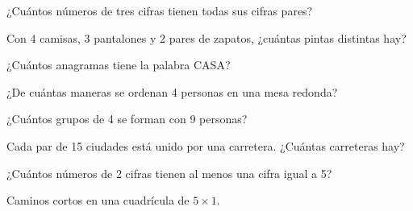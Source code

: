 \evaluacion
\begin{ejercicios}
\item ¿Cuántos números de tres cifras tienen todas sus cifras pares?
\item Con 4 camisas, 3 pantalones y 2 pares de zapatos, ¿cuántas pintas distintas hay?
\item ¿Cuántos anagramas tiene la palabra CASA?
\item ¿De cuántas maneras se ordenan 4 personas en una mesa redonda?
\item ¿Cuántos grupos de 4 se forman con 9 personas?
\item Cada par de 15 ciudades está unido por una carretera. ¿Cuántas carreteras hay?
\item ¿Cuántos números de 2 cifras tienen al menos una cifra igual a 5?
\item Caminos cortos en una cuadrícula de $5 \times 1$.
\end{ejercicios}
